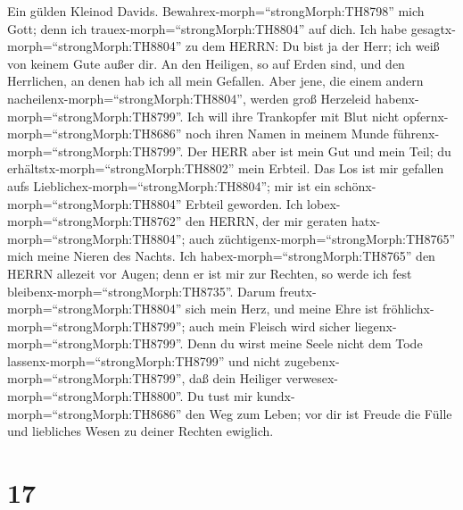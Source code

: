  Ein gülden Kleinod Davids.
Bewahrex-morph=``strongMorph:TH8798'' mich Gott; denn ich
trauex-morph=``strongMorph:TH8804'' auf dich.  Ich habe
gesagtx-morph=``strongMorph:TH8804'' zu dem HERRN: Du bist ja der Herr;
ich weiß von keinem Gute außer dir.  An den Heiligen, so auf
Erden sind, und den Herrlichen, an denen hab ich all mein Gefallen.
 Aber jene, die einem andern
nacheilenx-morph=``strongMorph:TH8804'', werden groß Herzeleid
habenx-morph=``strongMorph:TH8799''. Ich will ihre Trankopfer mit Blut
nicht opfernx-morph=``strongMorph:TH8686'' noch ihren Namen in meinem
Munde führenx-morph=``strongMorph:TH8799''.  Der HERR aber
ist mein Gut und mein Teil; du erhältstx-morph=``strongMorph:TH8802''
mein Erbteil.  Das Los ist mir gefallen aufs
Lieblichex-morph=``strongMorph:TH8804''; mir ist ein
schönx-morph=``strongMorph:TH8804'' Erbteil geworden.  Ich
lobex-morph=``strongMorph:TH8762'' den HERRN, der mir geraten
hatx-morph=``strongMorph:TH8804''; auch
züchtigenx-morph=``strongMorph:TH8765'' mich meine Nieren des Nachts.
 Ich habex-morph=``strongMorph:TH8765'' den HERRN allezeit
vor Augen; denn er ist mir zur Rechten, so werde ich fest
bleibenx-morph=``strongMorph:TH8735''.  Darum
freutx-morph=``strongMorph:TH8804'' sich mein Herz, und meine Ehre ist
fröhlichx-morph=``strongMorph:TH8799''; auch mein Fleisch wird sicher
liegenx-morph=``strongMorph:TH8799''.  Denn du wirst meine
Seele nicht dem Tode lassenx-morph=``strongMorph:TH8799'' und nicht
zugebenx-morph=``strongMorph:TH8799'', daß dein Heiliger
verwesex-morph=``strongMorph:TH8800''.  Du tust mir
kundx-morph=``strongMorph:TH8686'' den Weg zum Leben; vor dir ist Freude
die Fülle und liebliches Wesen zu deiner Rechten ewiglich.

\hypertarget{section-16}{%
\section{17}\label{section-16}}

